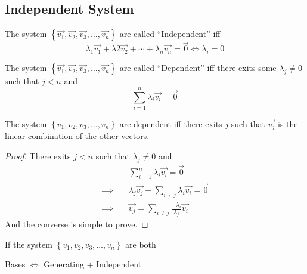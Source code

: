 \subsection{Independent System}
\begin{definition}[Independent]
  The system $\left\{\vec{v_1},\vec{v_2},\vec{v_3},\dots,
  \vec{v_n}\right\}$ are 
  called ``Independent'' iff
  \[
    \lambda_1\vec{v_1}+\lambda2\vec{v_2}+\cdots+
    \lambda_n\vec{v_n}=\vec{0}
    \iff \lambda_i=0
  \]
\end{definition}
\begin{definition}[Dependent]
  The system $\left\{\vec{v_1},\vec{v_2},
  \vec{v_3},\dots,\vec{v_n}\right\}$ are 
  called ``Dependent'' iff there exits some 
  $\lambda_j\neq 0$ such that $j<n$ and 
  \[\sum_{i=1}^{n}\lambda_i\vec{v_i}=\vec{0}\]
\end{definition}
\begin{proposition}
  The system $\left\{v_1,v_2,v_3,\dots,v_n\right\}$ are 
  dependent iff there exits $j$ such that 
  $\vec{v_j}$ is the linear combination of the other vectors.
\end{proposition}
\begin{proof}
  There exits $j<n$ such that $\lambda_j\neq 0$ and 
  \begin{align*}
    &\sum_{i=1}^{n}\lambda_i\vec{v_i}=\vec{0}\\
    \implies\quad &\lambda_j\vec{v_j}+
    \sum_{i\neq j}\lambda_i\vec{v_i}=\vec{0}\\
    \implies\quad &
    \vec{v_j}=\sum_{i\neq j}\frac{-\lambda_i}{\lambda_j}\vec{v_i}
  \end{align*}
  And the converse is simple to prove.
\end{proof}
\begin{proposition}
  If the system $\left\{v_1,v_2,v_3,\dots,v_n\right\}$ are
  both 
\end{proposition}
\begin{proposition}
  Bases $\iff$ Generating + Independent
\end{proposition}









